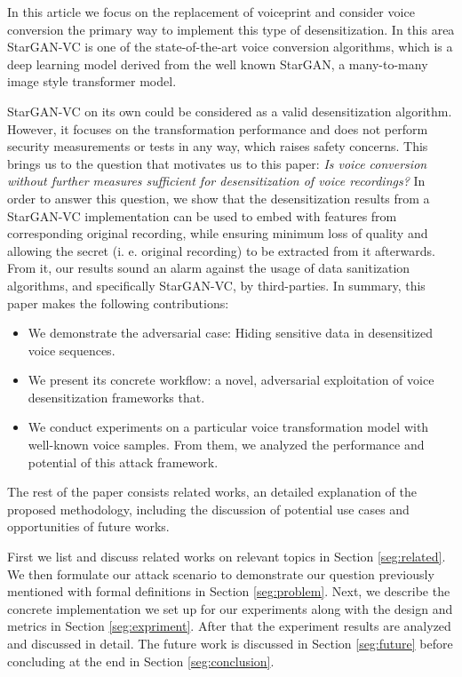 \documentclass[journal]{IEEEtran} %
\begin{document}
In this article we focus on the replacement of voiceprint and consider voice conversion the primary way to implement this type of desensitization. In this area StarGAN-VC is one of the state-of-the-art voice conversion algorithms, which is a deep learning model derived from the well known StarGAN, a many-to-many image style transformer model.

StarGAN-VC on its own could be considered as a valid desensitization algorithm. However, it focuses on the transformation performance and does not perform security measurements or tests in any way, which raises safety concerns. This brings us to the question that motivates us to this paper: \textit{Is voice conversion without further measures sufficient for desensitization of voice recordings?} In order to answer this question, we show that the desensitization results from a StarGAN-VC implementation can be used to embed with features from corresponding original recording, while ensuring minimum loss of quality and allowing the secret (i. e. original recording) to be extracted from it afterwards. From it, our results sound an alarm against the usage of data sanitization algorithms, and specifically StarGAN-VC, by third-parties. In summary, this paper makes the following contributions:

\begin{itemize}

\item We demonstrate the adversarial case: Hiding sensitive data in desensitized voice sequences.

\item We present its concrete workflow: a novel, adversarial exploitation of voice desensitization frameworks that.

\item We conduct experiments on a particular voice transformation model with well-known voice samples. From them, we analyzed the performance and potential of this attack framework.

\end{itemize}

The rest of the paper consists related works, an detailed explanation of the proposed methodology, including the discussion of potential use cases and opportunities of future works.

First we list and discuss related works on relevant topics in Section \ref{seg:related}. We then formulate our attack scenario to demonstrate our question previously mentioned with formal definitions in Section \ref{seg:problem}. Next, we describe the concrete implementation we set up for our experiments along with the design and metrics in Section \ref{seg:expriment}. After that the experiment results are analyzed and discussed in detail. The future work is discussed in Section \ref{seg:future} before concluding at the end in Section \ref{seg:conclusion}.
\end{document}
